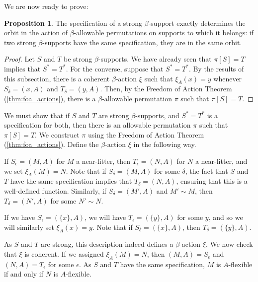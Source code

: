 \documentclass{article}
\theoremstyle{definition}
\newtheorem{proposition}[theorem]{Proposition}
\theoremstyle{remark}
\begin{document}
{We are now ready to prove:
\begin{proposition}\label{lem:specification_determines_orbit}
The specification of a strong $\beta$-support exactly determines the orbit in the action of $\beta$-allowable permutations on supports to which it belongs:  if two strong $\beta$-supports have the same specification, they are in the same orbit.
\end{proposition}
\begin{proof}
  Let $S$ and $T$ be strong $\beta$-supports.
  We have already seen that $\pi[S] = T$ implies that $S^* = T^*$.
  For the converse, suppose that $S^*=T^*$.
  By the results of this subsection, there is a coherent $\beta$-action $\xi$ such that $\xi_A(x) = y$ whenever $S_\delta = (x,A)$ and $T_\delta = (y,A)$.
  Then, by the Freedom of Action Theorem (\ref{thm:foa_actions}), there is a $\beta$-allowable permutation $\pi$ such that $\pi[S] = T$.
\end{proof}

\iffalse
We must show that if $S$ and $T$ are strong $\beta$-supports, and $S^*=T^*$ is a specification for both, then there is an allowable permutation $\pi$ such that $\pi[S]=T$.
We construct $\pi$ using the Freedom of Action Theorem (\ref{thm:foa_actions}).
Define the $\beta$-action $\xi$ in the following way.

If $S_\epsilon = (M,A)$ for $M$ a near-litter, then $T_\epsilon = (N,A)$ for $N$ a near-litter, and we set $\xi_A(M) = N$.
Note that if $S_\delta = (M,A)$ for some $\delta$, the fact that $S$ and $T$ have the same specification implies that $T_\delta = (N,A)$, ensuring that this is a well-defined function.
Similarly, if $S_\delta = (M',A)$ and $M' \sim M$, then $T_\delta = (N',A)$ for some $N' \sim N$.

If we have $S_\epsilon = (\{x\},A)$, we will have $T_\epsilon = (\{y\},A)$ for some $y$, and so we will similarly set $\xi_A(x) = y$.
Note that if $S_\delta = (\{x\},A)$, then $T_\delta = (\{y\},A)$.

As $S$ and $T$ are strong, this description indeed defines a $\beta$-action $\xi$.
We now check that $\xi$ is coherent.
If we assigned $\xi_A(M) = N$, then $(M,A) = S_\epsilon$ and $(N,A) = T_\epsilon$ for some $\epsilon$.
As $S$ and $T$ have the same specification, $M$ is $A$-flexible if and only if $N$ is $A$-flexible.

}
\end{document}
